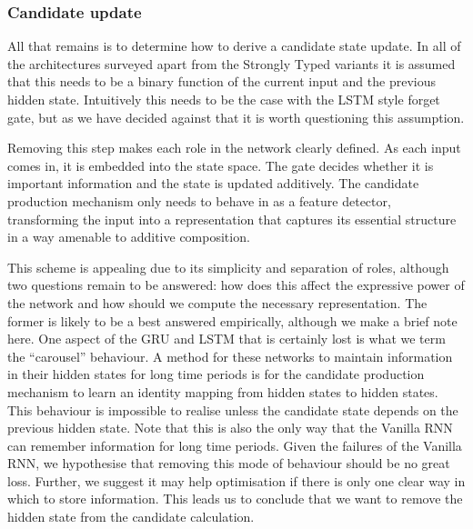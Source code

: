 \subsubsection{Candidate update}
All that remains is to determine how to derive a candidate state update. In all of the architectures
surveyed apart from the Strongly Typed variants \autocite{Balduzzi2016} it is assumed that this needs
to be a binary function of the current input and the previous hidden state. Intuitively this needs to
be the case with the LSTM style forget gate, but as we have decided against that it is worth questioning
this assumption.

Removing this step makes each role in the network clearly defined. As each input comes in, it is
embedded into the state space. The gate decides whether it is important information and the state is
updated additively. The candidate production mechanism only needs to behave in as a feature
detector, transforming the input into a representation that captures its essential structure in a way
amenable to additive composition.

This scheme is appealing due to its simplicity and separation of
roles, although two questions remain to be answered: how does this affect the expressive power of the
network and how should we compute the necessary representation. The former is likely to be a best
answered empirically, although we make a brief note here. One aspect of the GRU and LSTM that is
certainly lost is what we term the ``carousel'' behaviour. A method for these networks to maintain
information in their hidden states for long time periods is for the candidate production mechanism to
learn an identity mapping from hidden states to hidden states. This behaviour is impossible to realise
unless the candidate state depends on the previous hidden state. Note that this is also the only way
that the Vanilla RNN can remember information for long time periods. Given the failures of the
Vanilla RNN, we hypothesise that removing this mode of behaviour should be no great loss. Further,
we suggest it may help optimisation if there is only one clear way in which to store information. This
leads us to conclude that we want to remove the hidden state from the candidate calculation.

